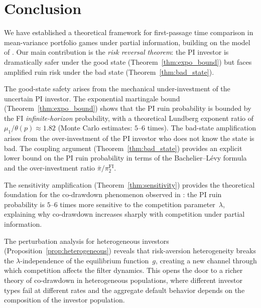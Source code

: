 \documentclass[12pt]{article}
\theoremstyle{remark}
\theoremstyle{definition}
\newcommand{\FI}{\mathrm{FI}}
\begin{document}
\section{Conclusion}\label{sec:conclude_v2}

We have established a theoretical framework for first-passage time
comparison in mean-variance portfolio games under partial information,
building on the model of \citet{HuangSun2025}.
Our main contribution is the \emph{risk reversal theorem}: the PI
investor is dramatically safer under the good state
(Theorem~\ref{thm:expo_bound}) but faces amplified ruin risk under
the bad state (Theorem~\ref{thm:bad_state}).

The good-state safety arises from the mechanical under-investment of
the uncertain PI investor.
The exponential martingale bound
(Theorem~\ref{thm:expo_bound}) shows that the PI ruin probability
is bounded by the FI \emph{infinite-horizon} probability, with a
theoretical Lundberg exponent ratio of $\mu_1/\theta(p) \approx 1.82$
(Monte Carlo estimates: $5$--$6$ times).
The bad-state amplification arises from the over-investment of the
PI investor who does not know the state is bad.
The coupling argument
(Theorem~\ref{thm:bad_state}) provides an explicit lower bound on
the PI ruin probability in terms of the Bachelier--L\'evy formula
and the over-investment ratio $\bar{\pi}/\pi_2^{\FI}$.

The sensitivity amplification (Theorem~\ref{thm:sensitivity}) provides
the theoretical foundation for the co-drawdown phenomenon observed in
\citet[Figure~4]{HuangSun2025}: the PI ruin probability is
$5$--$6$ times more sensitive to the competition parameter~$\lambda$,
explaining why co-drawdown increases sharply with competition under
partial information.

The perturbation analysis for heterogeneous investors
(Proposition~\ref{prop:heterogeneous}) reveals that risk-aversion
heterogeneity breaks the $\lambda$-independence of the equilibrium
function~$g$, creating a new channel through which competition affects
the filter dynamics.
This opens the door to a richer theory of co-drawdown in heterogeneous
populations, where different investor types fail at different rates
and the aggregate default behavior depends on the composition of the
investor population.


\end{document}
